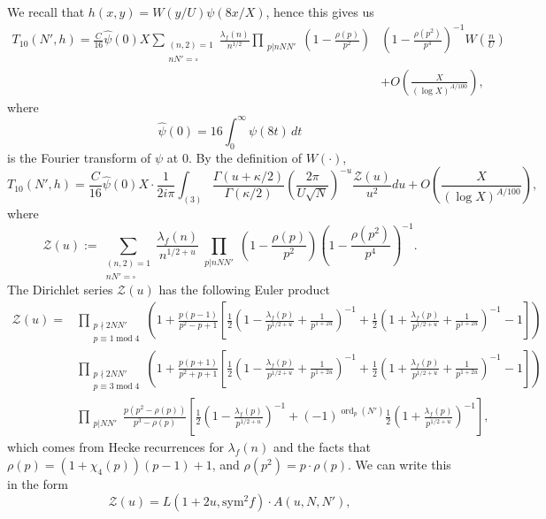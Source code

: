 \documentclass[12pt]{amsart}
\def\cZ{\mathcal Z}
\def\mod{\operatorname{mod}}
\def\log{\operatorname{log}}
\def\ord{\operatorname{ord}}
\begin{document}
We recall that $h(x,y)= W(y/U) \psi(8x/X)$, hence this gives us
\begin{align*}
 T_{10}(N',h)= \frac{C}{16}\hat{\psi}(0) X \sum_{\substack{(n,2)=1 \\ nN'=\square}}\frac{\lambda_f(n)} {n^{1/2}} \prod_{\substack{p|nNN'}}  \left(1  - \frac{\rho(p)}{p^2} \right)&\left( 1 - \frac{\rho(p^2)}{p^4}\right)^{-1}  W \left( \frac{n}{U} \right) \\
 &+ O\left( \frac{X}{(\log X)^{A/100}} \right),
 \end{align*}
where $$\hat{\psi}(0)=16\int_{0}^{\infty}\psi(8t)\,dt$$
is the Fourier transform of $\psi$ at $0$. By the definition of $W(\cdot)$, 
$$ T_{10}(N',h)= \frac{C}{16}  \hat{\psi}(0)X \cdot \frac{1}{2i\pi} \int_{(3)}\frac{\Gamma(u+\kappa/2)}{\Gamma(\kappa/2)}\left(\frac{2\pi}{U\sqrt{N}}\right)^{-u}\frac{\cZ(u)}{u^2} du + O\left( \frac{X}{(\log X)^{A/100}} \right), $$
where
$$ \cZ(u) :=   \sum_{\substack{(n,2)=1 \\ nN'=\square}}\frac{\lambda_f(n)} {n^{1/2+u}} \prod_{\substack{p|nNN'}}  \left(1  - \frac{\rho(p)}{p^2} \right) \left( 1 - \frac{\rho(p^2)}{p^4}\right)^{-1} . $$
 The Dirichlet series $\cZ(u)$ has the following Euler product
\begin{align*}
    \cZ(u) = &\prod_{\substack{p\nmid 2NN' \\ p\equiv 1 \mod 4 }} \left( 1 + \frac{p(p-1)}{p^2-p+1} \left[ \frac{1}{2}\left( 1 - \frac{\lambda_f(p)}{p^{1/2+u}}+ \frac{1}{p^{1+2u}} \right)^{-1} + \frac{1}{2}\left( 1 + \frac{\lambda_f(p)}{p^{1/2+u}}+ \frac{1}{p^{1+2u}} \right)^{-1} - 1\right] \right) \\
    &\prod_{\substack{p\nmid 2NN' \\ p\equiv 3 \mod 4 }} \left( 1 + \frac{p(p+1)}{p^2+p+1}\left[ \frac{1}{2}\left( 1 - \frac{\lambda_f(p)}{p^{1/2+u}}+ \frac{1}{p^{1+2u}} \right)^{-1} + \frac{1}{2}\left( 1 + \frac{\lambda_f(p)}{p^{1/2+u}}+ \frac{1}{p^{1+2u}} \right)^{-1} - 1\right] \right) \\
    &\prod_{\substack{p|NN'}}\frac{p(p^2-\rho(p))}{p^3-\rho(p)} \left[ \frac{1}{2}\left( 1 - \frac{\lambda_f(p)}{p^{1/2+u}} \right)^{-1} + (-1)^{\ord_p(N')}\frac{1}{2}\left( 1 + \frac{\lambda_f(p)}{p^{1/2+u}} \right)^{-1} \right],
\end{align*}
which comes from Hecke recurrences for $\lambda_f(n)$ and the facts that $\rho(p)=(1+\chi_4(p))(p-1)+1$, and $\rho(p^2)=p\cdot \rho(p)$. We can write this in the form
\begin{equation}\label{A(u)}
 \cZ(u)=L(1+2u,\text{sym}^2f) \cdot A(u,N, N'), 
 \end{equation}
\end{document}
